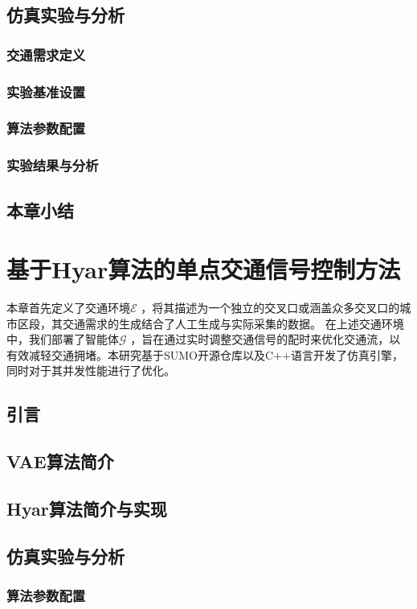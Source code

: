 \section{仿真实验与分析}

\subsection{交通需求定义}
\subsection{实验基准设置}
\subsection{算法参数配置}
\subsection{实验结果与分析}

\section{本章小结}



\chapter{基于Hyar算法的单点交通信号控制方法}
本章首先定义了交通环境$\mathcal{E}$ ，将其描述为一个独立的交叉口或涵盖众多交叉口的城市区段，其交通需求的生成结合了人工生成与实际采集的数据。
在上述交通环境中，我们部署了智能体$\mathcal{G}$ ，旨在通过实时调整交通信号的配时来优化交通流，以有效减轻交通拥堵。本研究基于SUMO开源仓库以及C++语言开发了仿真引擎，同时对于其并发性能进行了优化。
\section{引言}
\section{VAE算法简介}
\section{Hyar算法简介与实现}
\section{仿真实验与分析}

\subsection{算法参数配置}
